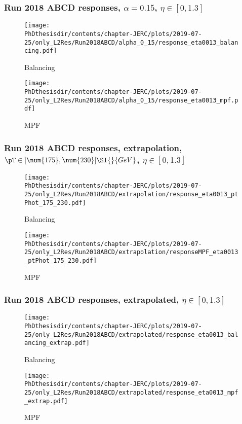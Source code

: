 \begin{frame}
\frametitle{Run 2018 ABCD responses, $\alpha=\num{0.15}$, $\eta\in [\num{0},\num{1.3}]$}
\begin{minipage}{.45\textwidth}
\begin{figure}
\texttt{[image: \\PhDthesisdir/contents/chapter-JERC/plots/2019-07-25/only\_L2Res/Run2018ABCD/alpha\_0\_15/response\_eta0013\_balancing.pdf]}
\caption{Balancing}
\end{figure}
\end{minipage}
\hfill
\begin{minipage}{.45\textwidth}
\begin{figure}
\texttt{[image: \\PhDthesisdir/contents/chapter-JERC/plots/2019-07-25/only\_L2Res/Run2018ABCD/alpha\_0\_15/response\_eta0013\_mpf.pdf]}
\caption{MPF}
\end{figure}
\end{minipage}
\end{frame}

\begin{frame}
\frametitle{Run 2018 ABCD responses, extrapolation, $\pT\in [\num{175},\num{230}]\SI{}{GeV}$, $\eta\in [\num{0},\num{1.3}]$}
\begin{minipage}{.45\textwidth}
\begin{figure}
\texttt{[image: \\PhDthesisdir/contents/chapter-JERC/plots/2019-07-25/only\_L2Res/Run2018ABCD/extrapolation/response\_eta0013\_ptPhot\_175\_230.pdf]}
\caption{Balancing}
\end{figure}
\end{minipage}
\hfill
\begin{minipage}{.45\textwidth}
\begin{figure}
\texttt{[image: \\PhDthesisdir/contents/chapter-JERC/plots/2019-07-25/only\_L2Res/Run2018ABCD/extrapolation/responseMPF\_eta0013\_ptPhot\_175\_230.pdf]}
\caption{MPF}
\end{figure}
\end{minipage}
\end{frame}

\begin{frame}
\frametitle{Run 2018 ABCD responses, extrapolated, $\eta\in [\num{0},\num{1.3}]$}
\begin{minipage}{.45\textwidth}
\begin{figure}
\texttt{[image: \\PhDthesisdir/contents/chapter-JERC/plots/2019-07-25/only\_L2Res/Run2018ABCD/extrapolated/response\_eta0013\_balancing\_extrap.pdf]}
\caption{Balancing}
\end{figure}
\end{minipage}
\hfill
\begin{minipage}{.45\textwidth}
\begin{figure}
\texttt{[image: \\PhDthesisdir/contents/chapter-JERC/plots/2019-07-25/only\_L2Res/Run2018ABCD/extrapolated/response\_eta0013\_mpf\_extrap.pdf]}
\caption{MPF}
\end{figure}
\end{minipage}
\end{frame}
